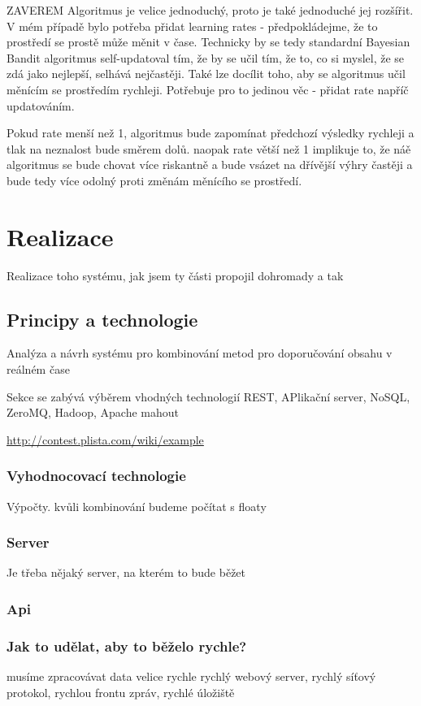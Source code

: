 \documentclass[thesis=M,czech]{FITthesis}[2014/05/07]
\begin{document}
ZAVEREM
Algoritmus je velice jednoduchý, proto je také jednoduché jej rozšířit. V mém případě bylo potřeba přidat learning rates - předpokládejme, že to prostředí se prostě může měnit v čase. Technicky by se tedy standardní Bayesian Bandit algoritmus self-updatoval tím, že by se učil tím, že to, co si myslel, že se zdá jako nejlepší, selhává nejčastěji. Také lze docílit toho, aby se algoritmus učil měnícím se prostředím rychleji. Potřebuje pro to jedinou věc - přidat rate napříč updatováním.

Pokud rate menší než 1, algoritmus bude zapomínat předchozí výsledky rychleji a tlak na neznalost bude směrem dolů. naopak rate větší než 1 implikuje to, že náě algoritmus se bude chovat více riskantně a bude vsázet na dřívější výhry častěji a bude tedy více odolný proti změnám měnícího se prostředí.
		
\chapter{Realizace}
\label{chap:impl}
Realizace toho systému, jak jsem ty části propojil dohromady a tak

\section{Principy a technologie}
\label{sec:sysanalys}
Analýza a návrh systému pro kombinování metod pro doporučování obsahu v reálném čase

Sekce se zabývá výběrem vhodných technologií
REST, APlikační server, NoSQL, ZeroMQ, Hadoop, Apache mahout

\url{http://contest.plista.com/wiki/example}
	\subsection{Vyhodnocovací technologie}	
	Výpočty. kvůli kombinování budeme počítat s floaty
	\subsection{Server}		
	Je třeba nějaký server, na kterém to bude běžet
	\subsection{Api}		
	
	\subsection{Jak to udělat, aby to běželo rychle?}		
	musíme zpracovávat data velice rychle
	rychlý webový server, rychlý síťový protokol, rychlou frontu zpráv, rychlé úložiště
\end{document}
